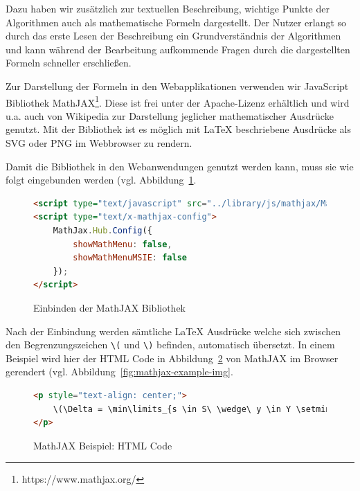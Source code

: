 Dazu haben wir zusätzlich zur textuellen Beschreibung, wichtige Punkte der Algorithmen auch als mathematische Formeln dargestellt. Der Nutzer erlangt so durch das erste Lesen der Beschreibung ein Grundverständnis der Algorithmen und kann während der Bearbeitung aufkommende Fragen durch die dargestellten Formeln schneller erschließen.

Zur Darstellung der Formeln in den Webapplikationen verwenden wir JavaScript Bibliothek MathJAX\footnote{https://www.mathjax.org/}. Diese ist frei unter der Apache-Lizenz erhältlich und wird u.a. auch von Wikipedia zur Darstellung jeglicher mathematischer Ausdrücke genutzt. Mit der Bibliothek ist es möglich mit LaTeX beschriebene Ausdrücke als SVG oder PNG im Webbrowser zu rendern. 

Damit die Bibliothek in den Webanwendungen genutzt werden kann, muss sie wie folgt eingebunden werden (vgl. Abbildung~\ref{fig:listing-mathjax-include}.

\begin{figure}[h!]
\begin{lstlisting}[language=HTML]
<script type="text/javascript" src="../library/js/mathjax/MathJax.js?config=TeX-AMS-MML_SVG.js&locale=de"></script>
<script type="text/x-mathjax-config">
	MathJax.Hub.Config({
		showMathMenu: false,
		showMathMenuMSIE: false
	});
</script>
\end{lstlisting}
\caption[MathJAX Einbindung]{Einbinden der MathJAX Bibliothek}\label{fig:listing-mathjax-include}
\end{figure}

Nach der Einbindung werden sämtliche LaTeX Ausdrücke welche sich zwischen den Begrenzungszeichen \texttt{\textbackslash(} und \texttt{\textbackslash)} befinden, automatisch übersetzt. In einem Beispiel wird hier der HTML Code in Abbildung~\ref{fig:listing-mathjax-example-html} von MathJAX im Browser gerendert (vgl. Abbildung~\ref{fig:mathjax-example-img}.

\begin{figure}[h!]
\begin{lstlisting}[language=HTML]
<p style="text-align: center;">
	\(\Delta = \min\limits_{s \in S\ \wedge\ y \in Y \setminus T}\{l(s) + l(y) - w(s,y)\}\)
</p>
\end{lstlisting}
\caption[MathJAX Beispiel Code]{MathJAX Beispiel: HTML Code}\label{fig:listing-mathjax-example-html}
\end{figure}


